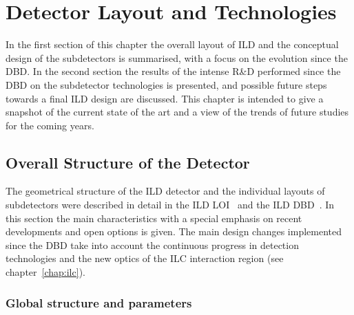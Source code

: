 \newcommand{\ilds}[1]{{\em#1}$^s$} %

\chapter{Detector Layout and Technologies}
\label{chap:technologies}

In the first section of this chapter the overall layout of ILD and the conceptual design of the subdetectors is summarised, with a focus on the evolution since the DBD. In the second section the results of the intense R\&D performed since the DBD on the subdetector technologies is presented, and possible future steps towards a final ILD design are discussed. This chapter is intended to give a snapshot of the current state of the art and a view of the trends of future studies for the coming years.      
\section{Overall Structure of the Detector}

The geometrical structure of the ILD detector and the individual layouts of subdetectors were described in detail in the ILD LOI~\cite{ild:bib:ILDloi} and the ILD DBD~\cite{ild:bib:ilddbd}. In this section the main characteristics with a special emphasis on recent developments and open options is given. The main design changes implemented since the DBD take into account the continuous progress in detection technologies and the new optics of the ILC interaction region (see chapter~\ref{chap:ilc}). 


\subsection{Global structure and parameters}




